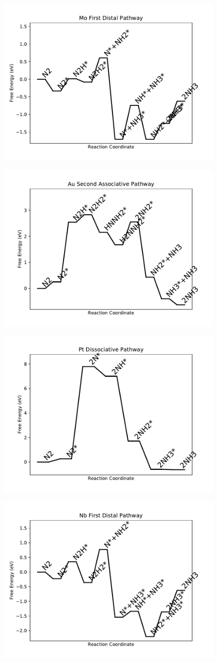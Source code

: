\documentclass[journal=jacsat,manuscript=article]{achemso}
\begin{document}
\newpage
\begin{figure}
\includegraphics[width=0.5\linewidth]{data/plots/Mo_distal_1.pdf}
\label{fig:Mo_distal_1}
\end{figure}

\begin{figure}
\includegraphics[width=0.5\linewidth]{data/plots/Au_associative_2.pdf}
\label{fig:Au_associative_2}
\end{figure}

\newpage
\begin{figure}
\includegraphics[width=0.5\linewidth]{data/plots/Pt_dissociative.pdf}
\label{fig:Pt_dissociative}
\end{figure}

\begin{figure}
\includegraphics[width=0.5\linewidth]{data/plots/Nb_distal_1.pdf}
\label{fig:Nb_distal_1}
\end{figure}
\end{document}
